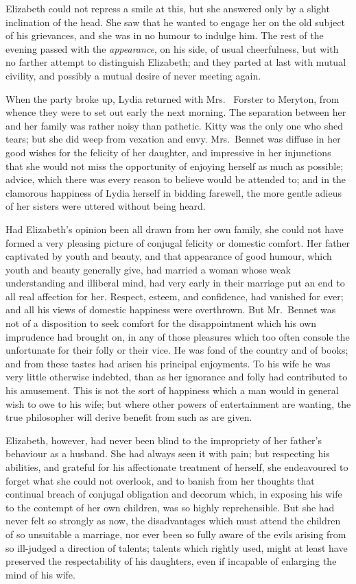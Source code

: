 Elizabeth could not repress a smile at this, but she
answered only by a slight inclination of the head. She
saw that he wanted to engage her on the old subject of
his grievances, and she was in no humour to indulge
him. The rest of the evening passed with the \textit{appearance},
on his side, of usual cheerfulness, but with no farther
attempt to distinguish Elizabeth; and they parted at last
with mutual civility, and possibly a mutual desire of never
meeting again.

When the party broke up, Lydia returned with Mrs.\ %
Forster to Meryton, from whence they were to set out
early the next morning. The separation between her and
her family was rather noisy than pathetic. Kitty was the
only one who shed tears; but she did weep from vexation
and envy. Mrs.\ Bennet was diffuse in her good wishes
for the felicity of her daughter, and impressive in her
injunctions that she would not miss the opportunity of
enjoying herself as much as possible; advice, which there
was every reason to believe would be attended to; and
in the clamorous happiness of Lydia herself in bidding
farewell, the more gentle adieus of her sisters were uttered
without being heard.


Had Elizabeth’s opinion been all drawn from her own
family, she could not have formed a very pleasing picture
of conjugal felicity or domestic comfort. Her father
captivated by youth and beauty, and that appearance
of good humour, which youth and beauty generally give,
had married a woman whose weak understanding and
illiberal mind, had very early in their marriage put an
end to all real affection for her. Respect, esteem, and
confidence, had vanished for ever; and all his views of
domestic happiness were overthrown. But Mr.\ Bennet
was not of a disposition to seek comfort for the disappointment
which his own imprudence had brought on, in any
of those pleasures which too often console the unfortunate
for their folly or their vice. He was fond of the country
and of books; and from these tastes had arisen his
principal enjoyments. To his wife he was very little
otherwise indebted, than as her ignorance and folly had
contributed to his amusement. This is not the sort of
happiness which a man would in general wish to owe
to his wife; but where other powers of entertainment
are wanting, the true philosopher will derive benefit from
such as are given.

Elizabeth, however, had never been blind to the impropriety
of her father’s behaviour as a husband. She
had always seen it with pain; but respecting his abilities,
and grateful for his affectionate treatment of herself, she
endeavoured to forget what she could not overlook, and
to banish from her thoughts that continual breach of
conjugal obligation and decorum which, in exposing his
wife to the contempt of her own children, was so highly
reprehensible. But she had never felt so strongly as now,
the disadvantages which must attend the children of so
unsuitable a marriage, nor ever been so fully aware of the
evils arising from so ill-judged a direction of talents;
talents which rightly used, might at least have preserved
the respectability of his daughters, even if incapable of
enlarging the mind of his wife.

